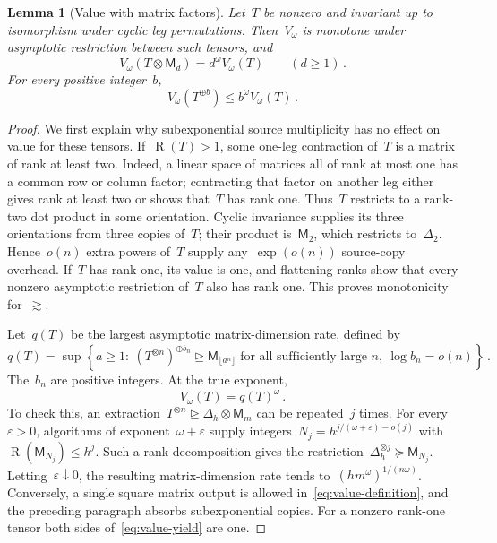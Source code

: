 \documentclass[11pt,letterpaper]{article}
\newtheorem{lemma}[theorem]{Lemma}
\theoremstyle{definition}
\numberwithin{equation}{section}
\newcommand{\MM}{\mathsf M}
\newcommand{\R}{\operatorname{R}}
\newcommand{\degen}{\unrhd}
\newcommand{\res}{\succeq}
\begin{document}
\begin{lemma}[Value with matrix factors]\label{lem:matrix-value}
Let~$T$ be nonzero and invariant up to isomorphism under cyclic leg permutations. Then~$V_\omega$ is monotone under asymptotic restriction between such tensors, and
\begin{equation}\label{eq:matrix-value}
 V_\omega(T\otimes\MM_d)=d^\omega V_\omega(T)
 \qquad(d\geq1)\,.
\end{equation}
For every positive integer~$b$,
\begin{equation}\label{eq:bounded-copies}
 V_\omega(T^{\oplus b})\leq b^\omega V_\omega(T)\,.
\end{equation}
\end{lemma}
\begin{proof}
We first explain why subexponential source multiplicity has no effect on value for these tensors. If~$\R(T)>1$, some one-leg contraction of~$T$ is a matrix of rank at least two. Indeed, a linear space of matrices all of rank at most one has a common row or column factor; contracting that factor on another leg either gives rank at least two or shows that~$T$ has rank one. Thus~$T$ restricts to a rank-two dot product in some orientation. Cyclic invariance supplies its three orientations from three copies of~$T$; their product is~$\MM_2$, which restricts to~$\Delta_2$. Hence~$o(n)$ extra powers of~$T$ supply any~$\exp(o(n))$ source-copy overhead. If~$T$ has rank one, its value is one, and flattening ranks show that every nonzero asymptotic restriction of~$T$ also has rank one. This proves monotonicity for~$\gtrsim$.

Let~$q(T)$ be the largest asymptotic matrix-dimension rate, defined by
\begin{equation*}
 q(T)=\sup\left\{a\geq1:\ (T^{\otimes n})^{\oplus b_n}\degen\MM_{\lfloor a^n\rfloor}
 \text{ for all sufficiently large }n,\ \log b_n=o(n)\right\}\,.
\end{equation*}
The~$b_n$ are positive integers. At the true exponent,
\begin{equation}\label{eq:value-yield}
 V_\omega(T)=q(T)^\omega\,.
\end{equation}
To check this, an extraction~$T^{\otimes n}\degen\Delta_h\otimes\MM_m$ can be repeated~$j$ times. For every~$\varepsilon>0$, algorithms of exponent~$\omega+\varepsilon$ supply integers~$N_j=h^{j/(\omega+\varepsilon)-o(j)}$ with~$\R(\MM_{N_j})\leq h^j$. Such a rank decomposition gives the restriction~$\Delta_h^{\otimes j}\res\MM_{N_j}$. Letting~$\varepsilon\downarrow0$, the resulting matrix-dimension rate tends to~$(hm^\omega)^{1/(n\omega)}$. Conversely, a single square matrix output is allowed in~\eqref{eq:value-definition}, and the preceding paragraph absorbs subexponential copies. For a nonzero rank-one tensor both sides of~\eqref{eq:value-yield} are one.


\end{proof}
\end{document}
